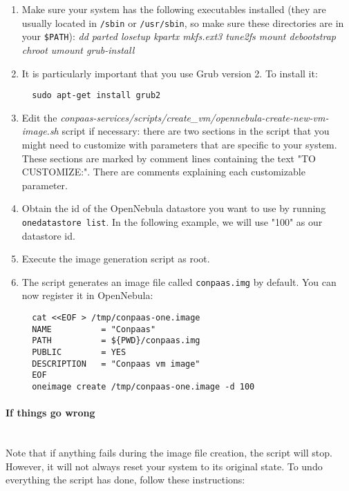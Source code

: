 \documentclass[10pt]{article}
\begin{document}
\begin{enumerate}
\item Make sure your system has the following executables installed
  (they are usually located in \verb+/sbin+ or \verb+/usr/sbin+, so
  make sure these directories are in your \verb+$PATH+): %
  \emph{dd parted losetup kpartx mkfs.ext3 tune2fs mount debootstrap
    chroot umount grub-install}
\item It is particularly important that you use Grub version 2. To
  install it:
  \begin{verbatim}
  sudo apt-get install grub2
  \end{verbatim}
\item Edit the
  \textit{conpaas-services/scripts/create\_vm/opennebula-create-new-vm-image.sh} script
  if necessary: there are two sections in the script that you might need
  to customize with parameters that are specific to your system. These
  sections are marked by comment lines containing the text "TO CUSTOMIZE:".
  There are comments explaining each customizable parameter. 
\item Obtain the id of the OpenNebula datastore you want to use by running
  \verb+onedatastore list+. In the following example, we will use "100" as our datastore id.
\item Execute the image generation script as root.
\item The script generates an image file called \verb+conpaas.img+
  by default. You can now register it in OpenNebula:

\vspace{10 mm}

\begin{verbatim}
  cat <<EOF > /tmp/conpaas-one.image
  NAME          = "Conpaas"
  PATH          = ${PWD}/conpaas.img
  PUBLIC        = YES
  DESCRIPTION   = "Conpaas vm image"
  EOF
  oneimage create /tmp/conpaas-one.image -d 100
\end{verbatim}
\end{enumerate}

\paragraph{If things go wrong}~\\

Note that if anything fails during the image file creation, the script
will stop. However, it will not always reset your system to its
original state. To undo everything the script has done, follow these
instructions:
\end{document}

